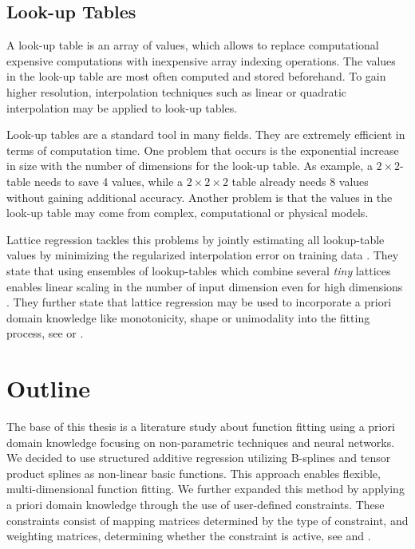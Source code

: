 \subsection{Look-up Tables}

A look-up table is an array of values, which allows to replace computational expensive computations with inexpensive array indexing operations. The values in the look-up table are most often computed and stored beforehand. To gain higher resolution, interpolation techniques such as linear or quadratic interpolation may be applied to look-up tables. 

Look-up tables are a standard tool in many fields. They are extremely efficient in terms of computation time. One problem that occurs is the exponential increase in size with the number of dimensions for the look-up table. As example, a $2 \times 2$-table needs to save 4 values, while a $2 \times 2 \times 2$ table already needs 8 values without gaining additional accuracy. Another problem is that the values in the look-up table may come from complex, computational or physical models. 

Lattice regression tackles this problems by jointly estimating all lookup-table values by minimizing the regularized interpolation error on training data \cite{garcia2009lattice}. They state that using ensembles of lookup-tables which combine several \emph{tiny} lattices enables linear scaling in the number of input dimension even for high dimensions \cite{fard2016fast}. They further state that lattice regression may be used to incorporate a priori domain knowledge like monotonicity, shape or unimodality into the fitting process, see \cite{gupta2016monotonic} or \cite{you2017deep}.

\section{Outline}

The base of this thesis is a literature study about function fitting using a priori domain knowledge focusing on non-parametric techniques and neural networks. We decided to use structured additive regression \cite{fahrmeir2007regression} utilizing B-splines and tensor product splines as non-linear basic functions. This approach enables flexible, multi-dimensional function fitting. We further expanded this method by applying a priori domain knowledge through the use of user-defined constraints. These constraints consist of mapping matrices determined by the type of constraint, and weighting matrices, determining whether the constraint is active, see \cite{hofner2011monotonicity} and \cite{bollaerts2006simple}.


